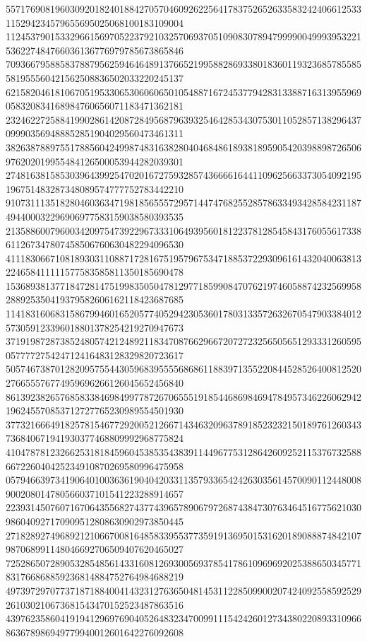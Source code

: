 \begin{DoxyCode}
      557176908196030920182401884270570460926225641783752652633583242406612533115294234579655695025068100183109004
      112453790153329661569705223792103257069370510908307894799990049993953221536227484766036136776979785673865846
      709366795885837887956259464648913766521995882869338018360119323685785585581955560421562508836502033220245137
      621582046181067051953306530606065010548871672453779428313388716313955969058320834168984760656071183471362181
      232462272588419902861420872849568796393254642853430753011052857138296437099903569488852851904029560473461311
      382638788975517885604249987483163828040468486189381895905420398898726506976202019955484126500053944282039301
      274816381585303964399254702016727593285743666616441109625663373054092195196751483287348089574777752783442210
      910731113518280460363471981856555729571447476825528578633493428584231187494400032296906977583159038580393535
      213588600796003420975473922967333106493956018122378128545843176055617338611267347807458506760630482294096530
      411183066710818930311088717281675195796753471885372293096161432040063813224658411111577583585811350185690478
      153689381377184728147519983505047812977185990847076219746058874232569958288925350419379582606162118423687685
      114183160683158679946016520577405294230536017803133572632670547903384012573059123396018801378254219270947673
      371919872873852480574212489211834708766296672072723256505651293331260595057777275424712416483128329820723617
      505746738701282095755443059683955556868611883971355220844528526400812520276655576774959696266126045652456840
      861392382657685833846984997787267065551918544686984694784957346226062942196245570853712727765230989554501930
      377321666491825781546772920052126671434632096378918523232150189761260343736840671941930377468809992968775824
      410478781232662531818459604538535438391144967753128642609252115376732588667226040425234910870269580996475958
      057946639734190640100363619040420331135793365424263035614570090112448008900208014780566037101541223288914657
      223931450760716706435568274377439657890679726874384730763464516775621030986040927170909512808630902973850445
      271828927496892121066700816485833955377359191369501531620189088874842107987068991148046692706509407620465027
      725286507289053285485614331608126930056937854178610969692025388650345771831766868859236814884752764984688219
      497397297077371871884004143231276365048145311228509900207424092558592529261030210673681543470152523487863516
      439762358604191941296976904052648323470099111542426012734380220893310966863678986949779940012601642276092608

\end{DoxyCode}
